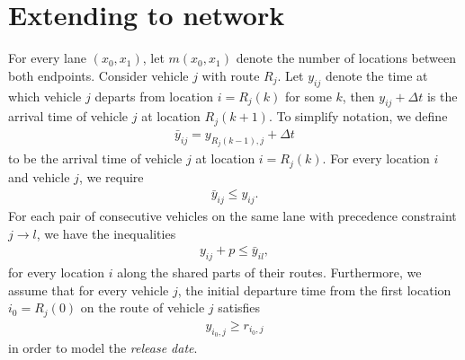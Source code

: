 \documentclass{article}
\theoremstyle{definition}
\theoremstyle{plain}
\begin{document}
{\color{gray}
\section{Extending to network}

For every lane $(x_{0}, x_{1})$, let $m(x_{0}, x_{1})$ denote the number of
locations between both endpoints. Consider vehicle $j$ with route $R_{j}$. Let
$y_{ij}$ denote the time at which vehicle $j$ departs from location
$i = R_{j}(k)$ for some $k$, then $y_{ij} + \Delta t$ is the arrival time of
vehicle $j$ at location $R_{j}(k+1)$. To simplify notation, we define
\begin{align}
  \bar{y}_{ij} = y_{R_{j}(k-1),j} + \Delta t
\end{align}
to be the arrival time of vehicle $j$ at location $i = R_{j}(k)$. For every
location $i$ and vehicle $j$, we require
\begin{align}
  \bar{y}_{ij} \leq y_{ij} .
\end{align}
For each pair of consecutive vehicles on the same lane
with precedence constraint $j \rightarrow l$, we have the inequalities
\begin{align}
  y_{ij} + p \leq \bar{y}_{il} ,
\end{align}
for every location $i$ along the shared parts of their routes. Furthermore, we
assume that for every vehicle $j$, the initial departure time from the first
location $i_{0} = R_{j}(0)$ on the route of vehicle $j$ satisfies
\begin{align}
  \label{eq:release}
  y_{i_{0},j} \geq r_{i_{0},j}
\end{align}
in order to model the \textit{release date}.
}


% 
% 
\end{document}
